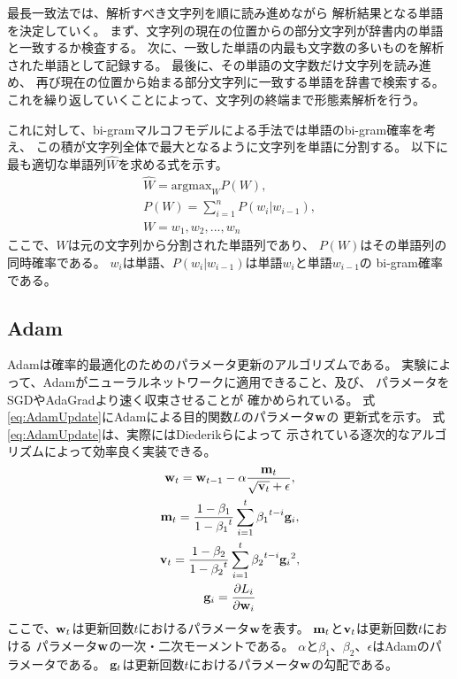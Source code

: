 最長一致法では、解析すべき文字列を順に読み進めながら
解析結果となる単語を決定していく。
まず、文字列の現在の位置からの部分文字列が辞書内の単語と一致するか検査する。
次に、一致した単語の内最も文字数の多いものを解析された単語として記録する。
最後に、その単語の文字数だけ文字列を読み進め、
再び現在の位置から始まる部分文字列に一致する単語を辞書で検索する。
これを繰り返していくことによって、文字列の終端まで形態素解析を行う。

これに対して、bi-gramマルコフモデルによる手法では単語のbi-gram確率を考え、
この積が文字列全体で最大となるように文字列を単語に分割する。
以下に最も適切な単語列$\hat{W}$を求める式を示す。
\begin{gather}
  \hat{W} = \text{argmax}_{W} P(W), \\
  P(W) = \sum^{n}_{i = 1} P(w_i | w_{i - 1}), \nonumber \\
  W = w_1, w_2, ... , w_n \nonumber
\end{gather}
ここで、$W$は元の文字列から分割された単語列であり、
$P(W)$はその単語列の同時確率である。
$w_i$は単語、$P(w_i | w_{i - 1})$は単語$w_i$と単語$w_{i - 1}$の
bi-gram確率である。


\subsection{Adam}

Adam\cite{diederik15}は確率的最適化のためのパラメータ更新のアルゴリズムである。
実験によって、Adamがニューラルネットワークに適用できること、及び、
パラメータをSGDやAdaGrad\cite{john12}より速く収束させることが
確かめられている。
式\ref{eq:AdamUpdate}にAdamによる目的関数$L$のパラメータ$\mathbf{w}$の
更新式を示す。
式\ref{eq:AdamUpdate}は、実際にはDiederikら\cite{diederik15}によって
示されている逐次的なアルゴリズムによって効率良く実装できる。
\begin{gather} \label{eq:AdamUpdate}
  \mathbf{w}_t = \mathbf{w}_{t - 1}
                 - \alpha \frac{\mathbf{m}_t}
                               {\sqrt{\mathbf{v}_t} + \epsilon}, \\
  \mathbf{m}_t = \frac{1 - \beta_1}{1 - {\beta_1}^t}
                 \sum^t_{i = 1} {\beta_1}^{t - i} \mathbf{g}_i, \nonumber \\
  \mathbf{v}_t = \frac{1 - \beta_2}{1 - {\beta_2}^t}
                 \sum^t_{i = 1} {\beta_2}^{t - i} {\mathbf{g}_i}^2, \nonumber \\
  \mathbf{g}_i = \frac{\partial L_i}{\partial \mathbf{w}_i} \nonumber
\end{gather}
ここで、$\mathbf{w}_t$は更新回数$t$におけるパラメータ$\mathbf{w}$を表す。
$\mathbf{m}_t$と$\mathbf{v}_t$は更新回数$t$における
パラメータ$\mathbf{w}$の一次・二次モーメントである。
$\alpha$と$\beta_1$、$\beta_2$、$\epsilon$はAdamのパラメータである。
$\mathbf{g}_t$は更新回数$t$におけるパラメータ$\mathbf{w}$の勾配である。

